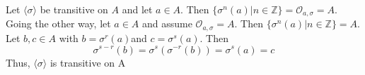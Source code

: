 \documentclass[12pt]{article}
\newcommand{\Z}{\mathds{Z}}
\begin{document}
\begin{enumerate}
	Let $\langle\sigma\rangle$ be transitive on $A $ and let $ a\in A $. Then $\{\sigma^n(a) | n \in \Z\} = \mathcal{O}_{a,\sigma} = A.$\\
	Going the other way, let $ a\in A $ and assume $\mathcal{O}_{a,\sigma} = A $. Then $\{\sigma^n (a) | n \in \Z\} = A.$ Let  $b, c \in A$ with $b = \sigma^r(a) $and $c = \sigma^s(a). $ Then
	\[ \sigma^{s-r}(b) = \sigma^s(\sigma^{-r}(b)) = \sigma^s(a) = c\]
	Thus, $\langle\sigma\rangle$ is transitive on A
	
\end{enumerate}
\end{document}
